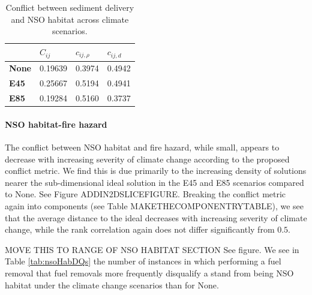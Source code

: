 \begin{table}[]
\centering
\caption[Sediment-NSO conflict across climate scenarios]{Conflict between sediment delivery and NSO habitat across climate scenarios.}
\label{tab:pairConflict-SedNSO}
\begin{tabular}{l|l|ll}
\textbf{}     & \textbf{$C_{ij}$} & \textbf{$c_{ij,\rho}$} & \textbf{$c_{ij,d}$} \\ \hline
\textbf{None} & 0.19639           & 0.3974                 & 0.4942              \\
\textbf{E45}  & 0.25667           & 0.5194                 & 0.4941              \\
\textbf{E85}  & 0.19284           & 0.5160                 & 0.3737             
\end{tabular}
\end{table}

\paragraph{NSO habitat-fire hazard}
The conflict between NSO habitat and fire hazard, while small, appears to decrease with increasing severity of climate change according to the proposed conflict metric. We find this is due primarily to the increasing density of solutions nearer the sub-dimensional ideal solution in the E45 and E85 scenarios compared to None. See Figure ADDIN2DSLICEFIGURE. Breaking the conflict metric again into components (see Table MAKETHECOMPONENTRYTABLE), we see that the average distance to the ideal decreases with increasing severity of climate change, while the rank correlation again does not differ significantly from $0.5$.

MOVE THIS TO RANGE OF NSO HABITAT SECTION
See figure. We see in Table \ref{tab:nsoHabDQs} the number of instances in which performing a fuel removal that fuel removals more frequently disqualify a stand from being NSO habitat under the climate change scenarios than for None.

